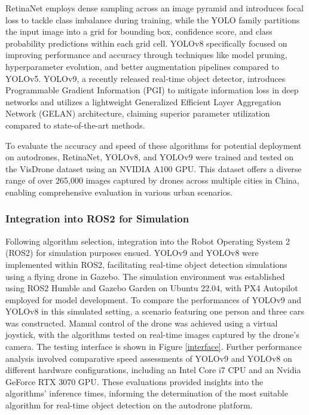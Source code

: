 \documentclass[conference]{IEEEtran}
\begin{document}
RetinaNet employs dense sampling across an image pyramid and introduces focal loss to tackle class imbalance during training, while the YOLO family partitions the input image into a grid for bounding box, confidence score, and class probability predictions within each grid cell. YOLOv8 specifically focused on improving performance and accuracy through techniques like model pruning, hyperparameter evolution, and better augmentation pipelines compared to YOLOv5. YOLOv9, a recently released real-time object detector, introduces Programmable Gradient Information (PGI) to mitigate information loss in deep networks and utilizes a lightweight Generalized Efficient Layer Aggregation Network (GELAN) architecture, claiming superior parameter utilization compared to state-of-the-art methods. 

To evaluate the accuracy and speed of these algorithms for potential deployment on autodrones, RetinaNet, YOLOv8, and YOLOv9 were trained and tested on the VisDrone dataset using an NVIDIA A100 GPU. This dataset offers a diverse range of over 265,000 images captured by drones across multiple cities in China, enabling comprehensive evaluation in various urban scenarios.

\subsubsection{Integration into ROS2 for Simulation}
Following algorithm selection, integration into the Robot Operating System 2 (ROS2) for simulation purposes ensued. YOLOv9 and YOLOv8 were implemented within ROS2, facilitating real-time object detection simulations using a flying drone in Gazebo. The simulation environment was established using ROS2 Humble and Gazebo Garden on Ubuntu 22.04, with PX4 Autopilot employed for model development. To compare the performances of YOLOv9 and YOLOv8 in this simulated setting, a scenario featuring one person and three cars was constructed. Manual control of the drone was achieved using a virtual joystick, with the algorithms tested on real-time images captured by the drone's camera. The testing interface is shown in Figure \ref{interface}. Further performance analysis involved comparative speed assessments of YOLOv9 and YOLOv8 on different hardware configurations, including an Intel Core i7 CPU and an Nvidia GeForce RTX 3070 GPU. These evaluations provided insights into the algorithms' inference times, informing the determination of the most suitable algorithm for real-time object detection on the autodrone platform.
\end{document}
